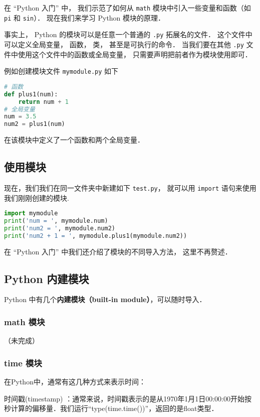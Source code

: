

在 “Python 入门” 中， 我们示范了如何从 \verb|math| 模块中引入一些变量和函数（如 \verb|pi| 和 \verb|sin|）． 现在我们来学习 Python 模块的原理．

事实上， Python 的模块可以是任意一个普通的 \verb|.py| 拓展名的文件． 这个文件中可以定义全局变量， 函数， 类， 甚至是可执行的命令． 当我们要在其他 \verb|.py| 文件中使用这个文件中的函数或全局变量， 只需要声明把前者作为模块使用即可．

例如创建模块文件 \verb|mymodule.py| 如下
\begin{lstlisting}[language=python]
# 函数
def plus1(num):
    return num + 1
# 全局变量
num = 3.5
num2 = plus1(num)
\end{lstlisting}
在该模块中定义了一个函数和两个全局变量．

\subsection{使用模块}
现在，我们我们在同一文件夹中新建如下 \verb|test.py|， 就可以用 \verb|import| 语句来使用我们刚刚创建的模块.
\begin{lstlisting}[language=python]
import mymodule
print('num = ', mymodule.num)
print('num2 = ', mymodule.num2)
print('num2 + 1 = ', mymodule.plus1(mymodule.num2))
\end{lstlisting}
在 “Python 入门” 中我们还介绍了模块的不同导入方法， 这里不再赘述．

\subsection{Python 内建模块}
Python 中有几个\textbf{内建模块（built-in module）}，可以随时导入．

\subsubsection{math 模块}
（未完成）

\subsubsection{time 模块}
在Python中，通常有这几种方式来表示时间：

时间戳(timestamp) ：通常来说，时间戳表示的是从1970年1月1日00:00:00开始按秒计算的偏移量．我们运行“type(time.time())”，返回的是float类型．


